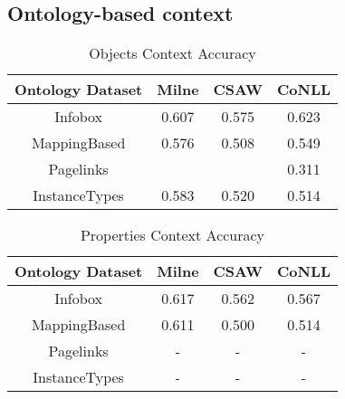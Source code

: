 \documentclass[10pt,a4paper]{article}
\newcommand{\todo}[1]{{\color{red}\textsf{\textbf{TODO}}: #1}}
\begin{document}

\subsection{Ontology-based context}





\begin{table}[ht] 
\caption{Objects Context Accuracy}
\centering
\begin{tabular}{c c c c}
\hline\hline 
Ontology Dataset	& Milne 	& CSAW 	& CoNLL \\ [0.5ex] 
\hline 
Infobox 			& 0.607	& 0.575	& 0.623 \\ 
MappingBased 		& 0.576 	& 0.508 	& 0.549 \\ 
Pagelinks 			&  		&  		& 0.311 \\ 
InstanceTypes 		& 0.583	& 0.520	& 0.514 \\  [1ex] 
\hline
\end{tabular} 
\label{table:nonlin} 
\end{table} 

\begin{table}[ht] 
\caption{Properties Context Accuracy} 
\centering
\begin{tabular}{c c c c}
\hline\hline 
Ontology Dataset	& Milne 	& CSAW 	& CoNLL \\ [0.5ex] 
\hline 
Infobox 			& 0.617	& 0.562	& 0.567 \\ 
MappingBased 		& 0.611 	& 0.500 	& 0.514 \\ 
Pagelinks 			&  -		&  -		& - \\ 
InstanceTypes 		&  -		&  -		& - \\  [1ex] 
\hline
\end{tabular} 
\label{table:nonlin} 
\end{table} 
\end{document}
